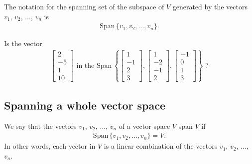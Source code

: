 \documentclass[12pt,a4paper]{article}
\newcommand{\Span}{\mathrm{Span}\,}
\newcounter{example}[section]
\begin{document}
	\vspace*{12pt}
	
	\noindent The notation for the spanning set of the subspace of $V$ generated by the vectors $v_1$, $v_2$, $\ldots$, $v_n$ is
		\begin{align*}
		\Span \{ v_1 , v_2 , \ldots , v_n \} .
		\end{align*}
	
	\vspace*{16pt}
	
	\begin{example}
	Is the vector
		\begin{align*}
		\begin{bmatrix}
		2 \\ -5 \\ 1 \\ 10
		\end{bmatrix}
		\text{ in the }
		\Span \left\lbrace 
		\begin{bmatrix}
		1 \\ -1 \\ 2 \\ 3
		\end{bmatrix} , 
		\begin{bmatrix}
		1 \\ -2 \\ -1 \\ 2
		\end{bmatrix}
		, 
		\begin{bmatrix}
		-1 \\ 0 \\ 1 \\ 3
		\end{bmatrix}
		\right\rbrace \text{ ?}
		\end{align*}
	\end{example}
	
	\newpage
	
	\subsection{Spanning a whole vector space}
	
	We say that the vectors $v_1$, $v_2$, $\ldots$, $v_n$ of a vector space $V$ span $V$ if
		\begin{align*}
		\Span \{ v_1 , v_2 , \ldots , v_n \} = V .
		\end{align*}
	In other words, each vector in $V$ is a linear combination of the vectors $v_1$, $v_2$, $\ldots$, $v_n$.
	
	\vspace*{18pt}
	
\end{document}
